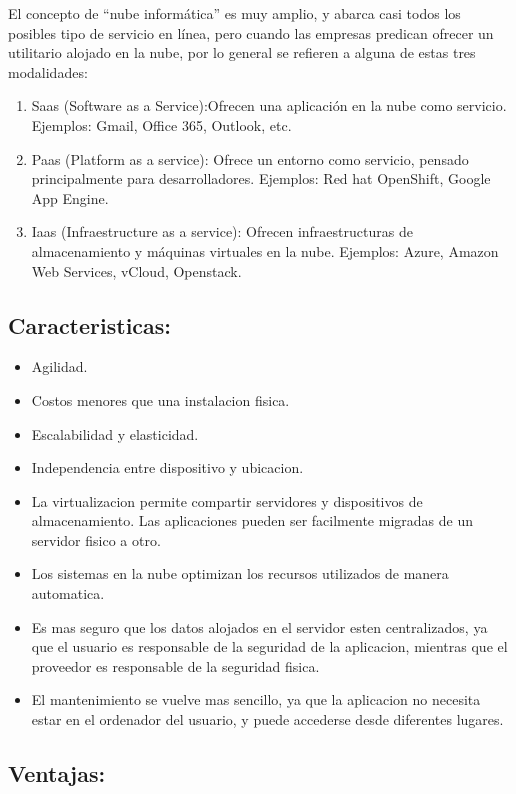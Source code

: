 \documentclass[12pt,letterpaper]{article}
\begin{document}
El concepto de “nube informática” es muy amplio, y abarca casi todos los posibles tipo de servicio en línea, pero cuando las empresas predican ofrecer un utilitario alojado en la nube, por lo general se refieren a alguna de estas tres modalidades:
\begin{enumerate}
\item Saas (Software as a Service):Ofrecen una aplicación en la nube como servicio. Ejemplos: Gmail, Office 365, Outlook, etc.
\item Paas (Platform as a service): Ofrece un entorno como servicio, pensado principalmente para desarrolladores. Ejemplos: Red hat OpenShift, Google App Engine.
\item Iaas (Infraestructure as a service): Ofrecen infraestructuras de almacenamiento y máquinas virtuales en la nube. Ejemplos: Azure, Amazon Web Services, vCloud, Openstack.
\end{enumerate}

\subsection{Caracteristicas:}
\begin{itemize}
\item Agilidad.
\item Costos menores que una instalacion fisica.
\item Escalabilidad y elasticidad.
\item Independencia entre dispositivo y ubicacion.
\item La virtualizacion permite compartir servidores y dispositivos de almacenamiento. Las aplicaciones pueden ser facilmente migradas de un servidor fisico a otro.
\item Los sistemas en la nube optimizan los recursos utilizados de manera automatica.
\item Es mas seguro que los datos alojados en el servidor esten centralizados, ya que el usuario es responsable de la seguridad de la aplicacion, mientras que el proveedor es responsable de la seguridad fisica.
\item El mantenimiento se vuelve mas sencillo, ya que la aplicacion no necesita estar en el ordenador del usuario, y puede accederse desde diferentes lugares.
\end{itemize}

\subsection{Ventajas:}
\end{document}
